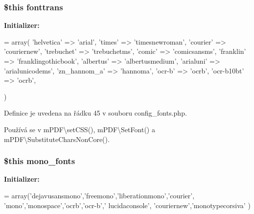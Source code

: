 \hypertarget{config__fonts_8php_a3ea01491bf16c688ebd3fdb160544418}{
\subsubsection[{fonttrans}]{\setlength{\rightskip}{0pt plus 5cm}\$this fonttrans}}\label{config__fonts_8php_a3ea01491bf16c688ebd3fdb160544418}
{\bfseries Initializer\-:}
\begin{DoxyCode}
= array(
    \textcolor{stringliteral}{'helvetica'} => \textcolor{stringliteral}{'arial'},
    \textcolor{stringliteral}{'times'} => \textcolor{stringliteral}{'timesnewroman'},
    \textcolor{stringliteral}{'courier'} => \textcolor{stringliteral}{'couriernew'},
    \textcolor{stringliteral}{'trebuchet'} => \textcolor{stringliteral}{'trebuchetms'},
    \textcolor{stringliteral}{'comic'} => \textcolor{stringliteral}{'comicsansms'},
    \textcolor{stringliteral}{'franklin'} => \textcolor{stringliteral}{'franklingothicbook'},
    \textcolor{stringliteral}{'albertus'} => \textcolor{stringliteral}{'albertusmedium'},
    \textcolor{stringliteral}{'arialuni'} => \textcolor{stringliteral}{'arialunicodems'},
    \textcolor{stringliteral}{'zn\_hannom\_a'} => \textcolor{stringliteral}{'hannoma'},
    \textcolor{stringliteral}{'ocr-b'} => \textcolor{stringliteral}{'ocrb'},
    \textcolor{stringliteral}{'ocr-b10bt'} => \textcolor{stringliteral}{'ocrb'},


)
\end{DoxyCode}


Definice je uvedena na řádku 45 v souboru config\-\_\-fonts.\-php.



Používá se v m\-P\-D\-F\textbackslash{}set\-C\-S\-S(), m\-P\-D\-F\textbackslash{}\-Set\-Font() a m\-P\-D\-F\textbackslash{}\-Substitute\-Chars\-Non\-Core().

\hypertarget{config__fonts_8php_a96d0c9a2044c13a6fc48a7ee36658b18}{
\subsubsection[{mono\-\_\-fonts}]{\setlength{\rightskip}{0pt plus 5cm}\$this mono\-\_\-fonts}}\label{config__fonts_8php_a96d0c9a2044c13a6fc48a7ee36658b18}
{\bfseries Initializer\-:}
\begin{DoxyCode}
= array(\textcolor{stringliteral}{'dejavusansmono'},\textcolor{stringliteral}{'freemono'},\textcolor{stringliteral}{'liberationmono'},\textcolor{stringliteral}{'courier'}, \textcolor{stringliteral}{'mono'},\textcolor{stringliteral}{'monospace'},\textcolor{stringliteral}{'ocrb'},\textcolor{stringliteral}{'ocr-b'},\textcolor{stringliteral}{'
      lucidaconsole'},
                \textcolor{stringliteral}{'couriernew'},\textcolor{stringliteral}{'monotypecorsiva'}
)
\end{DoxyCode}


